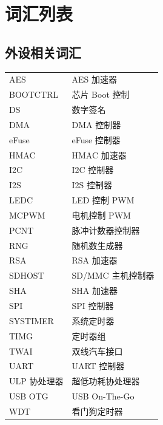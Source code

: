 \section*{词汇列表}\label{glossary}
\rhead{\Navigation}

\subsection*{外设相关词汇}

\begin{longtable}[c]{p{3cm}p{12cm} }

AES & AES 加速器 \\ 
BOOTCTRL & 芯片 Boot 控制 \\ 
DS & 数字签名 \\ 
DMA & DMA 控制器 \\
eFuse & eFuse 控制器 \\
HMAC & HMAC 加速器 \\ 
I2C & I2C 控制器 \\
I2S & I2S 控制器 \\
LEDC & LED 控制 PWM \\
MCPWM & 电机控制 PWM \\
PCNT & 脉冲计数器控制器 \\
RNG & 随机数生成器 \\
RSA & RSA 加速器 \\
SDHOST & SD/MMC 主机控制器 \\
SHA & SHA 加速器 \\
SPI & SPI 控制器 \\
SYSTIMER & 系统定时器  \\ 
TIMG & 定时器组 \\
TWAI & 双线汽车接口 \\ 
UART & UART 控制器 \\
ULP 协处理器 & 超低功耗协处理器\\
USB OTG & USB On-The-Go \\ 
WDT & 看门狗定时器 \\

\end{longtable}





